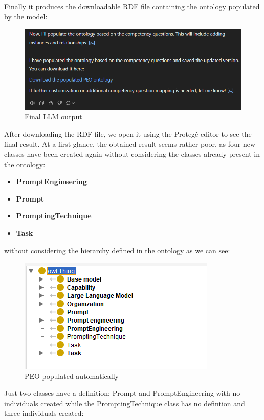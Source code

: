 Finally it produces the downloadable RDF file containing the ontology populated by the model:
\begin{figure}[H]
    \centering
    \includegraphics[width=0.9\linewidth]{Figures/fig_37.png}
    \caption{Final LLM output}
    \label{fig:enter-label}
\end{figure}
After downloading the RDF file, we open it using the Protegé editor to see the final result. At a first glance, the obtained result seems rather poor, as four new classes have been created again without considering the classes already present in the ontology:
\begin{itemize}
    \item \textbf{PromptEngineering}
    \item \textbf{Prompt}
    \item \textbf{PromptingTechnique}
    \item \textbf{Task}
\end{itemize}
without considering the hierarchy defined in the ontology as we can see:
\begin{figure}[H]
    \centering
    \includegraphics[width=0.9\linewidth]{Figures/fig_38.png}
    \caption{PEO populated automatically}
    \label{fig:enter-label}
\end{figure}
Just two classes have a definition: Prompt and PromptEngineering with no individuals created while the PromptingTechnique class has no defintion and three individuals created:
